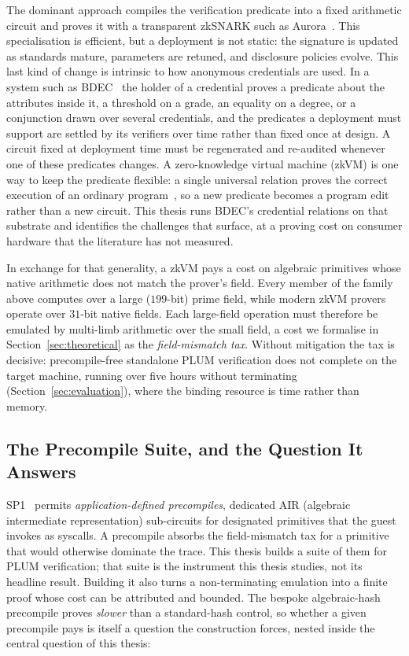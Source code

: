 The dominant approach compiles the verification predicate into a fixed arithmetic circuit and proves it with a transparent zkSNARK such as Aurora~\cite{cryptoeprint:2018/828}. This specialisation is efficient, but a deployment is not static: the signature is updated as standards mature, parameters are retuned, and disclosure policies evolve. This last kind of change is intrinsic to how anonymous credentials are used. In a system such as BDEC~\cite{10.1007/978-981-96-0957-4_3} the holder of a credential proves a predicate about the attributes inside it, a threshold on a grade, an equality on a degree, or a conjunction drawn over several credentials, and the predicates a deployment must support are settled by its verifiers over time rather than fixed once at design. A circuit fixed at deployment time must be regenerated and re-audited whenever one of these predicates changes. A zero-knowledge virtual machine (zkVM) is one way to keep the predicate flexible: a single universal relation proves the correct execution of an ordinary program~\cite{cryptoeprint:2023/1032,yang2026sokzkvm}, so a new predicate becomes a program edit rather than a new circuit. This thesis runs BDEC's credential relations on that substrate and identifies the challenges that surface, at a proving cost on consumer hardware that the literature has not measured.

In exchange for that generality, a zkVM pays a cost on algebraic primitives whose native arithmetic does not match the prover's field. Every member of the family above computes over a large ($199$-bit) prime field, while modern zkVM provers operate over $31$-bit native fields. Each large-field operation must therefore be emulated by multi-limb arithmetic over the small field, a cost we formalise in Section~\ref{sec:theoretical} as the \emph{field-mismatch tax}. Without mitigation the tax is decisive: precompile-free standalone PLUM verification does not complete on the target machine, running over five hours without terminating (Section~\ref{sec:evaluation}), where the binding resource is time rather than memory.

\subsection{The Precompile Suite, and the Question It Answers}\label{ssec:question}
SP1~\cite{succinct2024sp1} permits \emph{application-defined precompiles}, dedicated AIR (algebraic intermediate representation) sub-circuits for designated primitives that the guest invokes as syscalls. A precompile absorbs the field-mismatch tax for a primitive that would otherwise dominate the trace. This thesis builds a suite of them for PLUM verification; that suite is the instrument this thesis studies, not its headline result. Building it also turns a non-terminating emulation into a finite proof whose cost can be attributed and bounded. The bespoke algebraic-hash precompile proves \emph{slower} than a standard-hash control, so whether a given precompile pays is itself a question the construction forces, nested inside the central question of this thesis:

